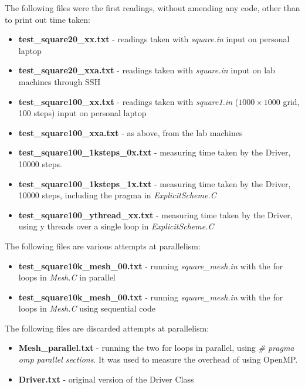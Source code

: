 \documentclass[11pt,journal]{IEEEtran}
\begin{document}
	The following files were the first readings, without amending any code, other than to print out time taken:
	
	\begin{itemize}
		\item \textbf{test\_square20\_xx.txt} - readings taken with \emph{square.in} input on personal laptop
		\item \textbf{test\_square20\_xxa.txt} - readings taken with \emph{square.in} input on lab machines through SSH	
		\item \textbf{test\_square100\_xx.txt} - readings taken with \emph{square1.in} ($1000 \times 1000$ grid, 100 steps) input on personal laptop
		\item \textbf{test\_square100\_xxa.txt} - as above, from the lab machines
		\item \textbf{test\_square100\_1ksteps\_0x.txt} - measuring time taken by the Driver, 10000 steps.
		\item \textbf{test\_square100\_1ksteps\_1x.txt} - measuring time taken by the Driver, 10000 steps, including the pragma in \emph{ExplicitScheme.C}
		\item \textbf{test\_square100\_ythread\_xx.txt} - measuring time taken by the Driver, using y threads over a single loop in \emph{ExplicitScheme.C}
	\end{itemize}

	The following files are various attempts at parallelism:
	\begin{itemize}
		\item \textbf{test\_square10k\_mesh\_00.txt} - running \emph{square\_mesh.in} with the for loops in \emph{Mesh.C} in parallel
		\item \textbf{test\_square10k\_mesh\_00.txt} - running \emph{square\_mesh.in} with the for loops in \emph{Mesh.C} using sequential code
	\end{itemize}

	The following files are discarded attempts at parallelism:
	\begin{itemize}
		\item \textbf{Mesh\_parallel.txt} - running the two for loops in parallel, using \emph{\# pragma omp parallel sections}. It was used to measure the overhead of using OpenMP.
		\item \textbf{Driver.txt} - original version of the Driver Class
	\end{itemize}



	
\end{document}
